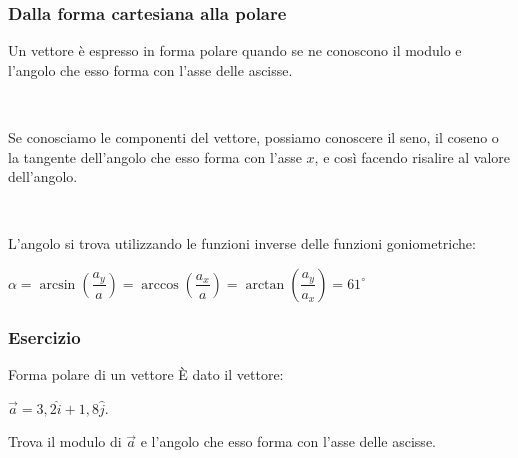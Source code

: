 \documentclass[]{beamer}
\theoremstyle{plain}
\begin{document}
\begin{frame}
\frametitle{Dalla forma cartesiana alla polare}
Un vettore è espresso in \alert<1>{forma polare} quando se ne conoscono il modulo e l'angolo che esso forma con l'asse delle ascisse.\pause

~

Se conosciamo le componenti del vettore, possiamo conoscere il seno, il coseno o la tangente dell'angolo che esso forma con l'asse $ x $, e così facendo risalire al valore dell'angolo.\pause

~

L'angolo si trova utilizzando le funzioni inverse delle funzioni goniometriche:
\begin{center}
$ \alpha = \arcsin \left( \dfrac{a_y}{a} \right) = \arccos \left( \dfrac{a_x}{a} \right) = \arctan \left( \dfrac{a_y}{a_x} \right) = 61^{\circ} $
\end{center}
\end{frame}

\begin{frame}
\frametitle{Esercizio}
\begin{exampleblock}{Forma polare di un vettore}
È dato il vettore:
  \begin{center}
    $ \vec{a} = 3,2\hat{i} + 1,8\hat{j} $.
  \end{center}
Trova il modulo di $ \vec{a} $ e l'angolo che esso forma con l'asse delle ascisse.
\end{exampleblock} 
\end{frame}
\end{document}
